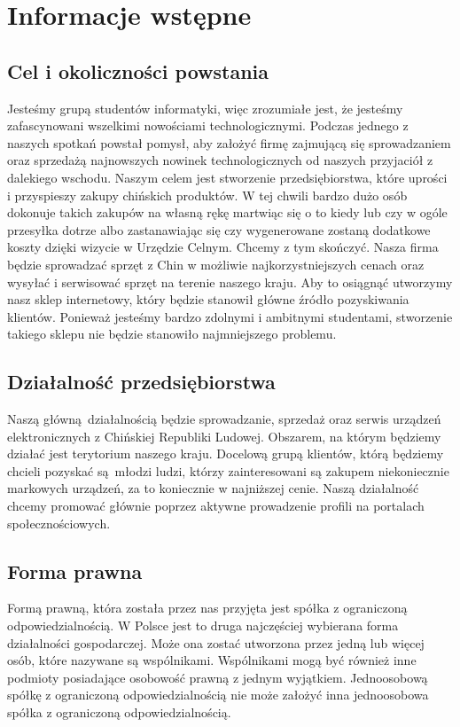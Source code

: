 \section{Informacje wstępne}
\subsection{Cel i okoliczności powstania}
Jesteśmy grupą studentów informatyki, więc zrozumiałe jest, że jesteśmy zafascynowani wszelkimi nowościami technologicznymi. Podczas jednego z naszych spotkań powstał pomysł, aby założyć firmę zajmującą się sprowadzaniem oraz sprzedażą najnowszych nowinek technologicznych od naszych przyjaciół z dalekiego wschodu. Naszym celem jest stworzenie przedsiębiorstwa, które uprości i przyspieszy zakupy chińskich produktów. W tej chwili bardzo dużo osób dokonuje takich zakupów na własną rękę martwiąc się o to kiedy lub czy w ogóle przesyłka dotrze albo zastanawiając się czy wygenerowane zostaną dodatkowe koszty dzięki wizycie w Urzędzie Celnym. Chcemy z tym skończyć. Nasza firma będzie sprowadzać sprzęt z Chin w możliwie najkorzystniejszych cenach oraz wysyłać i serwisować sprzęt na terenie naszego kraju. Aby to osiągnąć utworzymy nasz sklep internetowy, który będzie stanowił główne źródło pozyskiwania klientów. Ponieważ jesteśmy bardzo zdolnymi i ambitnymi studentami, stworzenie takiego sklepu nie będzie stanowiło najmniejszego problemu.
\subsection{Działalność przedsiębiorstwa}
Naszą główną działalnością będzie sprowadzanie, sprzedaż oraz serwis urządzeń elektronicznych z Chińskiej Republiki Ludowej. Obszarem, na którym będziemy działać jest terytorium naszego kraju. Docelową grupą klientów, którą będziemy chcieli pozyskać są młodzi ludzi, którzy zainteresowani są zakupem niekoniecznie markowych urządzeń, za to koniecznie w najniższej cenie. Naszą działalność chcemy promować głównie poprzez aktywne prowadzenie profili na portalach społecznościowych.
\subsection{Forma prawna}
Formą prawną, która została przez nas przyjęta jest spółka z ograniczoną odpowiedzialnością. W Polsce jest to druga najczęściej wybierana forma działalności gospodarczej. Może ona zostać utworzona przez jedną lub więcej osób, które nazywane są wspólnikami. Wspólnikami mogą być również inne podmioty posiadające osobowość prawną z jednym wyjątkiem. Jednoosobową spółkę z ograniczoną odpowiedzialnością nie może założyć inna jednoosobowa spółka z ograniczoną odpowiedzialnością. 

